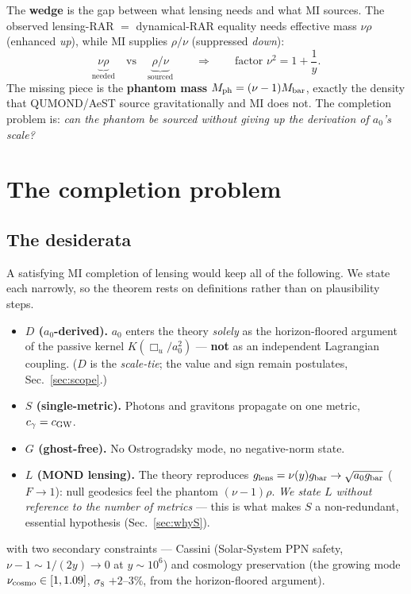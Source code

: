 \documentclass[11pt]{article}
\newcommand{\Boxu}{\Box_u}
\newcommand{\gbar}{g_{\rm bar}}
\newcommand{\glens}{g_{\rm lens}}
\newcommand{\cgw}{c_{\rm GW}}
\newcommand{\Mph}{M_{\rm ph}}
\begin{document}
The \textbf{wedge} is the gap between what lensing needs and what MI sources. The observed lensing-RAR $=$ dynamical-RAR equality \cite{brouwer2021} needs effective mass $\nu\rho$ (enhanced \emph{up}), while MI supplies $\rho/\nu$ (suppressed \emph{down}):
\begin{equation}
\underbrace{\nu\rho}_{\text{needed}}\quad\text{vs}\quad\underbrace{\rho/\nu}_{\text{sourced}}
\qquad\Longrightarrow\qquad \text{factor }\nu^2=1+\frac1y.
\end{equation}
The missing piece is the \textbf{phantom mass} $\Mph=(\nu-1)M_{\rm bar}$, exactly the density that QUMOND/AeST source gravitationally and MI does not. The completion problem is: \emph{can the phantom be sourced without giving up the derivation of $a_0$'s scale?}

\section{The completion problem}\label{sec:completion}

\subsection{The desiderata}\label{sec:desiderata}

A satisfying MI completion of lensing would keep all of the following. We state each narrowly, so the theorem rests on definitions rather than on plausibility steps.
\begin{itemize}
\item \textbf{$D$ ($a_0$-derived).} $a_0$ enters the theory \emph{solely} as the horizon-floored argument of the passive kernel $K(\Boxu/a_0^2)$ --- \textbf{not} as an independent Lagrangian coupling. ($D$ is the \emph{scale-tie}; the value and sign remain postulates, Sec.~\ref{sec:scope}.)
\item \textbf{$S$ (single-metric).} Photons and gravitons propagate on one metric, $c_\gamma=\cgw$.
\item \textbf{$G$ (ghost-free).} No Ostrogradsky mode, no negative-norm state.
\item \textbf{$L$ (MOND lensing).} The theory reproduces $\glens=\nu(y)\gbar\to\sqrt{a_0\gbar}$ ($F\to1$): null geodesics feel the phantom $(\nu-1)\rho$. \emph{We state $L$ without reference to the number of metrics} --- this is what makes $S$ a non-redundant, essential hypothesis (Sec.~\ref{sec:whyS}).
\end{itemize}
with two secondary constraints --- Cassini (Solar-System PPN safety, $\nu-1\sim1/(2y)\to0$ at $y\sim10^6$) and cosmology preservation (the growing mode $\nu_{\rm cosmo}\in[1,1.09]$, $\sigma_8$ $+2$--$3\%$, from the horizon-floored argument).
\end{document}
